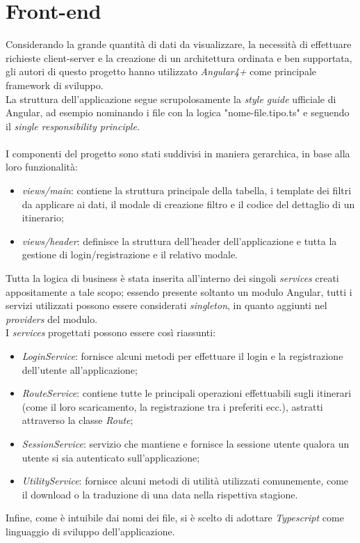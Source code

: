 \documentclass[11pt]{report}
\begin{document}
\section{Front-end}
Considerando la grande quantità di dati da visualizzare, la necessità di effettuare richieste client-server e la creazione di un architettura ordinata e ben supportata, gli autori di questo progetto hanno utilizzato \textit{Angular4+} come principale framework di sviluppo.
\\La struttura dell'applicazione segue scrupolosamente la \textit{style guide} ufficiale di Angular, ad esempio nominando i file con la logica "nome-file.tipo.ts" e seguendo il \textit{single responsibility principle}.
\\\\I componenti del progetto sono stati suddivisi in maniera gerarchica, in base alla loro funzionalità:
\begin{itemize}
	\item \textit{views/main}: contiene la struttura principale della tabella, i template dei filtri da applicare ai dati, il modale di creazione filtro e il codice del dettaglio di un itinerario;
	\item \textit{views/header}: definisce la struttura dell'header dell'applicazione e tutta la gestione di login/registrazione e il relativo modale.
\end{itemize}
Tutta la logica di business è stata inserita all'interno dei singoli \textit{services} creati appositamente a tale scopo; essendo presente soltanto un modulo Angular, tutti i servizi utilizzati possono essere considerati \textit{singleton}, in quanto aggiunti nel \textit{providers} del modulo.
\\I \textit{services} progettati possono essere così riassunti:
\begin{itemize}
	\item \textit{LoginService}: fornisce alcuni metodi per effettuare il login e la registrazione dell'utente all'applicazione;
	\item \textit{RouteService}: contiene tutte le principali operazioni effettuabili sugli itinerari (come il loro scaricamento, la registrazione tra i preferiti ecc.), astratti attraverso la classe \textit{Route};
	\item \textit{SessionService}: servizio che mantiene e fornisce la sessione utente qualora un utente si sia autenticato sull'applicazione;
	\item \textit{UtilityService}: fornisce alcuni metodi di utilità utilizzati comunemente, come il download o la traduzione di una data nella rispettiva stagione.
\end{itemize}
Infine, come è intuibile dai nomi dei file, si è scelto di adottare \textit{Typescript} come linguaggio di sviluppo dell'applicazione.
\pagebreak
\end{document}
